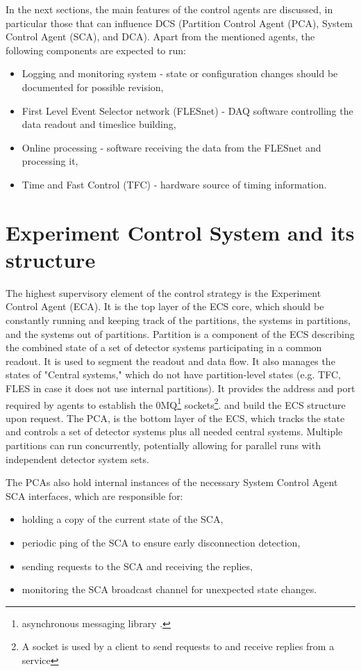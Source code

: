  In the next sections, the main features of the control agents are discussed, in particular those that can influence \gls{DCS} (Partition Control Agent (\gls{PCA}), System Control Agent (\gls{SCA}), and \gls{DCA}). Apart from the mentioned agents, the following components are expected to run: 
 \begin{itemize}
     \item Logging and monitoring system - state or configuration changes should be documented for possible revision,
     \item First Level Event Selector network (FLESnet) - \gls{DAQ} software controlling the data readout and timeslice building,
     \item Online processing - software receiving the data from the FLESnet and processing it,
     \item Time and Fast Control (\gls{TFC}) - hardware source of timing information.
 \end{itemize}
\section{Experiment Control System and its structure}\label{sssAgents}

The highest supervisory element of the control strategy is the Experiment Control Agent (\gls{ECA}). It is the top layer of the \gls{ECS} core, which should be constantly running and keeping track of the  partitions, the systems in partitions, and the systems out of partitions. Partition is a component of the \gls{ECS} describing the combined state of a set of detector systems participating in a common readout. It is used to segment the readout and data flow. It also manages the states of "Central systems," which do not have partition-level states (e.g. \gls{TFC}, \gls{FLES} in case it does not use internal partitions).  It provides the address and port required by agents to establish the 0MQ\footnote{asynchronous messaging library \cite{zeromq}.} sockets\footnote{A socket is used by a client to send requests to and receive replies from a service}. and build the \gls{ECS} structure upon request. The \gls{PCA}, is the bottom layer of the \gls{ECS}, which tracks the state and controls a set of detector systems plus all needed central systems. Multiple partitions can run concurrently, potentially allowing for parallel runs with independent detector system sets. 

The \glspl{PCA} also hold internal instances of the necessary System Control Agent \gls{SCA} interfaces, which are responsible for:
\begin{itemize}
 \item holding a copy of the current state of the \gls{SCA},
 \item periodic ping of the \gls{SCA} to ensure early disconnection detection,
 \item sending requests to the \gls{SCA} and receiving the replies,
 \item monitoring the \gls{SCA} broadcast channel for unexpected state changes.
\end{itemize}

